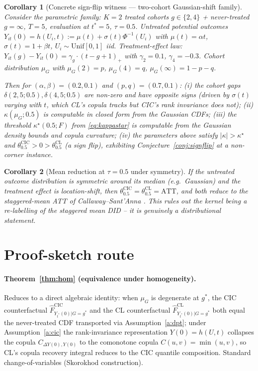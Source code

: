 \documentclass[11pt]{article}
\theoremstyle{definition}
\theoremstyle{plain}
\newtheorem{corollary}{Corollary}
\theoremstyle{remark}
\begin{document}
\begin{corollary}[Concrete sign-flip witness — two-cohort Gaussian-shift family]\label{cor:wit}
Consider the parametric family: $K = 2$ treated cohorts $g \in \{2, 4\}$ + never-treated $g = \infty$, $T = 5$, evaluation at $t^* = 5$, $\tau = 0.5$. Untreated potential outcomes $Y_{it}(0) = h(U_i, t) := \mu(t) + \sigma(t) \Phi^{-1}(U_i)$ with $\mu(t) = \alpha t$, $\sigma(t) = 1 + \beta t$, $U_i \sim \mathrm{Unif}[0,1]$ iid. Treatment-effect law: $Y_{it}(g) - Y_{it}(0) = \gamma_g \cdot (t - g + 1)_+$ with $\gamma_2 = 0.1$, $\gamma_4 = -0.3$. Cohort distribution $\mu_G$ with $\mu_G(2) = p$, $\mu_G(4) = q$, $\mu_G(\infty) = 1 - p - q$.

Then for $(\alpha, \beta) = (0.2, 0.1)$ and $(p, q) = (0.7, 0.1)$:
(i) the cohort gaps $\delta(2, 5; 0.5), \delta(4, 5; 0.5)$ are non-zero and have opposite signs (driven by $\sigma(t)$ varying with $t$, which CL's copula tracks but CIC's rank invariance does not);
(ii) $\kappa(\mu_G; 0.5)$ is computable in closed form from the Gaussian CDFs;
(iii) the threshold $\kappa^\star(0.5; F)$ from \eqref{eq:kappastar} is computable from the Gaussian density bounds and copula curvature;
(iv) the parameters above satisfy $|\kappa| > \kappa^\star$ and $\theta^{\mathrm{CIC}}_{0.5} > 0 > \theta^{\mathrm{CL}}_{0.5}$ (a sign flip), exhibiting Conjecture~\ref{conj:signflip} at a non-corner instance.
\end{corollary}

\begin{corollary}[Mean reduction at $\tau = 0.5$ under symmetry]
If the untreated outcome distribution is symmetric around its median (e.g.\ Gaussian) and the treatment effect is location-shift, then $\theta^{\mathrm{CIC}}_{0.5} = \theta^{\mathrm{CL}}_{0.5} = \mathrm{ATT}$, and both reduce to the staggered-mean ATT of Callaway--Sant'Anna \cite{CallawaySantAnna2021}. This rules out the kernel being a re-labelling of the staggered mean DID -- it is genuinely a distributional statement.
\end{corollary}

\section{Proof-sketch route}

\paragraph{Theorem~\ref{thm:hom} (equivalence under homogeneity).} Reduces to a direct algebraic identity: when $\mu_G$ is degenerate at $g^*$, the CIC counterfactual $\widehat{F}^{\mathrm{CIC}}_{Y_{t^*}(0)|G=g^*}$ and the CL counterfactual $\widehat{F}^{\mathrm{CL}}_{Y_{t^*}(0)|G=g^*}$ both equal the never-treated CDF transported via Assumption~\ref{a:dpt}; under Assumption~\ref{a:cic} the rank-invariance representation $Y(0) = h(U,t)$ collapses the copula $C_{\Delta Y(0), Y(0)}$ to the comonotone copula $C(u,v) = \min(u,v)$, so CL's copula recovery integral reduces to the CIC quantile composition. Standard change-of-variables (Skorokhod construction).
\end{document}
